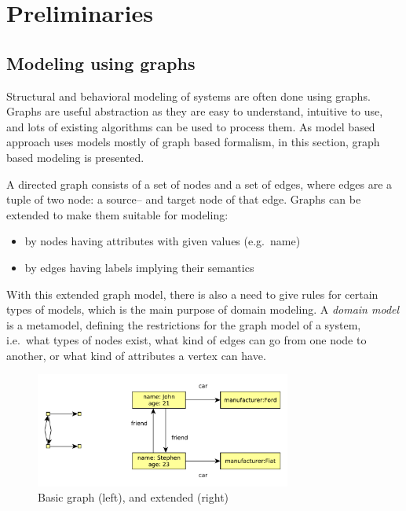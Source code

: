 
\chapter{Preliminaries}


\section{Modeling using graphs}

Structural and behavioral modeling of systems are often done using graphs. 
Graphs are useful abstraction as they are easy to understand, intuitive to use, and lots of existing algorithms can be used to process them. 
As model based approach uses models mostly of graph based formalism, in this section, graph based modeling is presented.

A directed graph consists of a set of nodes and a set of edges, where edges are a tuple of two node: a source-- and target node of that edge. 
Graphs can be extended to make them suitable for modeling:

\begin{itemize}
	\item by nodes having attributes with given values (e.g.\ name)
	\item by edges having labels implying their semantics
\end{itemize}

With this extended graph model, there is also a need to give rules for certain types of models, which is the main purpose of domain modeling.
A \emph{domain model} is a metamodel, defining the restrictions for the graph model of a system, i.e.\ what types of nodes exist, what kind of edges can go from one node to another, or what kind of attributes a vertex can have.

\begin{figure}[h]
	\begin{center}
		\includegraphics[width=0.75\textwidth]{figures/graphs.pdf}
		\caption{Basic graph (left), and extended (right) }
		\label{fig:graphs}
	\end{center}
\end{figure}


